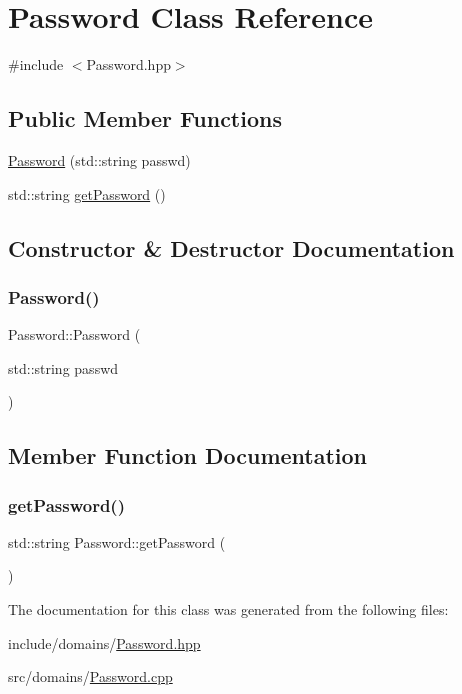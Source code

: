 \hypertarget{class_password}{}\section{Password Class Reference}
\label{class_password}


{\ttfamily \#include $<$Password.\+hpp$>$}

\subsection*{Public Member Functions}
\begin{DoxyCompactItemize}
\item 
\mbox{\hyperlink{class_password_a0396be0fcff4a511c431e44d015dbe08}{Password}} (std\+::string passwd)
\item 
std\+::string \mbox{\hyperlink{class_password_aee8284b06e0c79e83030de2cb4d7fa19}{get\+Password}} ()
\end{DoxyCompactItemize}


\subsection{Constructor \& Destructor Documentation}
\mbox{\label{class_password_a0396be0fcff4a511c431e44d015dbe08}} 
\subsubsection{\texorpdfstring{Password()}{Password()}}
{\footnotesize\ttfamily Password\+::\+Password (\begin{DoxyParamCaption}\item[{std\+::string}]{passwd }\end{DoxyParamCaption})}



\subsection{Member Function Documentation}
\mbox{\label{class_password_aee8284b06e0c79e83030de2cb4d7fa19}} 
\subsubsection{\texorpdfstring{getPassword()}{getPassword()}}
{\footnotesize\ttfamily std\+::string Password\+::get\+Password (\begin{DoxyParamCaption}{ }\end{DoxyParamCaption})}



The documentation for this class was generated from the following files\+:\begin{DoxyCompactItemize}
\item 
include/domains/\mbox{\hyperlink{_password_8hpp}{Password.\+hpp}}\item 
src/domains/\mbox{\hyperlink{_password_8cpp}{Password.\+cpp}}\end{DoxyCompactItemize}
